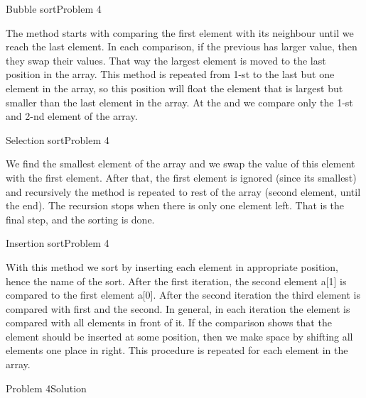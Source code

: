 \begin{frame}[fragile]{Bubble sort}{Problem 4}
\begin{scriptsize}
The method starts with comparing the first element with its neighbour until we
reach the last element. In each comparison, if the previous has larger value,
then they swap their values. That way the largest element is moved to the last
position in the array. This method is repeated from 1-st to the last but one
element in the array, so this position will float the element that is largest
but smaller than the last element in the array. At the and we compare only the
1-st and 2-nd element of the array.
\end{scriptsize}

\end{frame}

\begin{frame}[fragile]{Selection sort}{Problem 4}
\begin{scriptsize}
We find the smallest element of the array and we swap the value of this element
with the first element. After that, the first element is ignored (since its
smallest) and recursively the method is repeated to rest of the array (second
element, until the end). The recursion stops when there is only one element
left.
That is the final step, and the sorting is done.
\end{scriptsize}

\end{frame}

\begin{frame}[fragile]{Insertion sort}{Problem 4}
\begin{scriptsize}
With this method we sort by inserting each element in appropriate position,
hence the name of the sort. After the first iteration, the second element a[1] is
compared to the first element a[0]. After the second iteration the third
element is compared with first and the second. In general, in each iteration
the element is compared with all elements in front of it. If the comparison
shows that the element should be inserted at some position, then we make space
by shifting all elements one place in right. This procedure is repeated for
each element in the array.
\end{scriptsize}

\end{frame}

\begin{frame}[fragile]{Problem 4}{Solution}

\end{frame}
